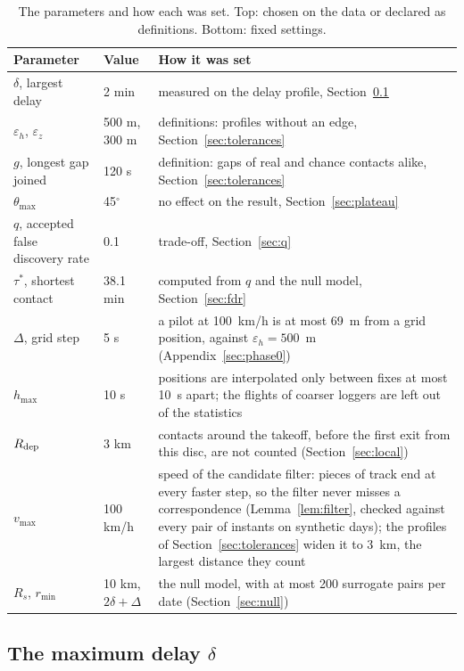 \begin{table}
\centering
\small
\begin{tabularx}{\textwidth}{@{}l l X@{}}
\toprule
Parameter & Value & How it was set \\
\midrule
$\delta$, largest delay & 2 min & measured on the delay profile, Section~\ref{sec:delta-choice} \\
$\varepsilon_h$, $\varepsilon_z$ & 500 m, 300 m & definitions: profiles without an edge, Section~\ref{sec:tolerances} \\
$g$, longest gap joined & 120 s & definition: gaps of real and chance contacts alike, Section~\ref{sec:tolerances} \\
$\theta_{\max}$ & 45$^\circ$ & no effect on the result, Section~\ref{sec:plateau} \\
$q$, accepted false discovery rate & 0.1 & trade-off, Section~\ref{sec:q} \\
$\tau^*$, shortest contact & 38.1 min & computed from $q$ and the null model, Section~\ref{sec:fdr} \\
\midrule
$\Delta$, grid step & 5 s & a pilot at 100~km/h is at most 69~m from a grid position, against
  $\varepsilon_h=500$~m (Appendix~\ref{sec:phase0}) \\
$h_{\max}$ & 10 s & positions are interpolated only between fixes at most 10~s apart; the flights
  of coarser loggers are left out of the statistics \\
$R_{\mathrm{dep}}$ & 3 km & contacts around the takeoff, before the first exit from this disc, are not
  counted (Section~\ref{sec:local}) \\
$v_{\max}$ & 100 km/h & speed of the candidate filter: pieces of track end at every faster step, so
  the filter never misses a correspondence (Lemma~\ref{lem:filter}, checked against every pair of
  instants on synthetic days); the profiles of Section~\ref{sec:tolerances} widen it to 3~km, the
  largest distance they count \\
$R_s$, $r_{\min}$ & 10 km, $2\delta+\Delta$ & the null model, with at most 200 surrogate pairs per
  date (Section~\ref{sec:null}) \\
\bottomrule
\end{tabularx}
\caption{The parameters and how each was set. Top: chosen on the data or declared as definitions.
Bottom: fixed settings.}
\label{tab:parameters}
\end{table}

\subsection{The maximum delay \texorpdfstring{$\delta$}{delta}}\label{sec:delta-choice}

